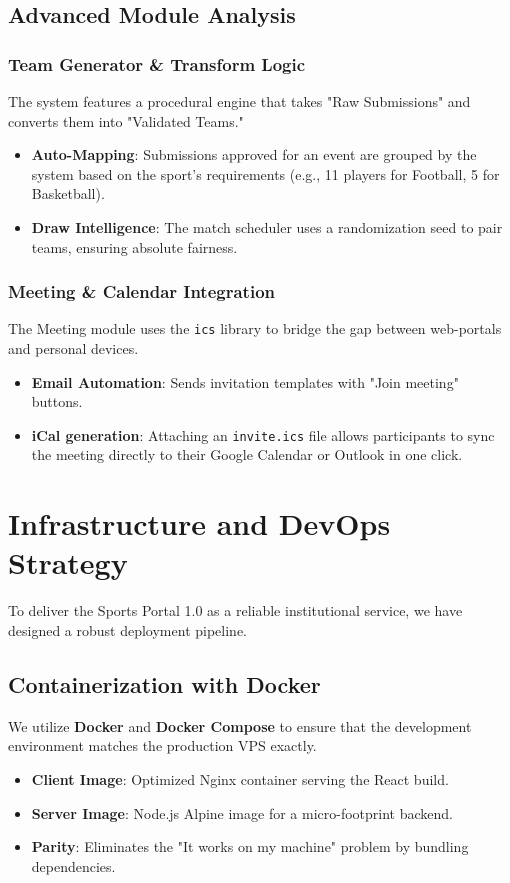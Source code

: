 \documentclass[12pt,a4paper]{article}
\begin{document}
\subsection{Advanced Module Analysis}

\subsubsection{Team Generator \& Transform Logic}
The system features a procedural engine that takes "Raw Submissions" and converts them into "Validated Teams."
\begin{itemize}
    \item \textbf{Auto-Mapping}: Submissions approved for an event are grouped by the system based on the sport's requirements (e.g., 11 players for Football, 5 for Basketball).
    \item \textbf{Draw Intelligence}: The match scheduler uses a randomization seed to pair teams, ensuring absolute fairness.
\end{itemize}

\subsubsection{Meeting \& Calendar Integration}
The Meeting module uses the \texttt{ics} library to bridge the gap between web-portals and personal devices.
\begin{itemize}
    \item \textbf{Email Automation}: Sends invitation templates with "Join meeting" buttons.
    \item \textbf{iCal generation}: Attaching an \texttt{invite.ics} file allows participants to sync the meeting directly to their Google Calendar or Outlook in one click.
\end{itemize}

\section{Infrastructure and DevOps Strategy}

To deliver the Sports Portal 1.0 as a reliable institutional service, we have designed a robust deployment pipeline.

\subsection{Containerization with Docker}
We utilize \textbf{Docker} and \textbf{Docker Compose} to ensure that the development environment matches the production VPS exactly.
\begin{itemize}
    \item \textbf{Client Image}: Optimized Nginx container serving the React build.
    \item \textbf{Server Image}: Node.js Alpine image for a micro-footprint backend.
    \item \textbf{Parity}: Eliminates the "It works on my machine" problem by bundling dependencies.
\end{itemize}
\end{document}
